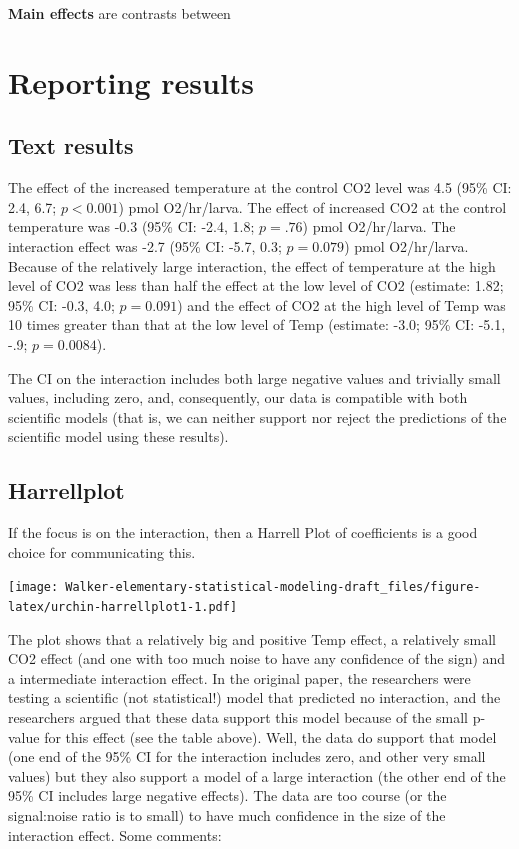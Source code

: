 \documentclass[]{book}
\theoremstyle{definition}
\theoremstyle{definition}
\theoremstyle{definition}
\theoremstyle{remark}
\begin{document}
\textbf{Main effects} are contrasts between

\section{Reporting results}\label{reporting-results-2}

\subsection{Text results}\label{text-results}

The effect of the increased temperature at the control CO2 level was 4.5
(95\% CI: 2.4, 6.7; \(p < 0.001\)) pmol O2/hr/larva. The effect of
increased CO2 at the control temperature was -0.3 (95\% CI: -2.4, 1.8;
\(p=.76\)) pmol O2/hr/larva. The interaction effect was -2.7 (95\% CI:
-5.7, 0.3; \(p = 0.079\)) pmol O2/hr/larva. Because of the relatively
large interaction, the effect of temperature at the high level of CO2
was less than half the effect at the low level of CO2 (estimate: 1.82;
95\% CI: -0.3, 4.0; \(p = 0.091\)) and the effect of CO2 at the high
level of Temp was 10 times greater than that at the low level of Temp
(estimate: -3.0; 95\% CI: -5.1, -.9; \(p = 0.0084\)).

The CI on the interaction includes both large negative values and
trivially small values, including zero, and, consequently, our data is
compatible with both scientific models (that is, we can neither support
nor reject the predictions of the scientific model using these results).

\subsection{Harrellplot}\label{harrellplot}

If the focus is on the interaction, then a Harrell Plot of coefficients
is a good choice for communicating this.

\texttt{[image: Walker-elementary-statistical-modeling-draft\_files/figure-latex/urchin-harrellplot1-1.pdf]}

The plot shows that a relatively big and positive Temp effect, a
relatively small CO2 effect (and one with too much noise to have any
confidence of the sign) and a intermediate interaction effect. In the
original paper, the researchers were testing a scientific (not
statistical!) model that predicted no interaction, and the researchers
argued that these data support this model because of the small p-value
for this effect (see the table above). Well, the data do support that
model (one end of the 95\% CI for the interaction includes zero, and
other very small values) but they also support a model of a large
interaction (the other end of the 95\% CI includes large negative
effects). The data are too course (or the signal:noise ratio is to
small) to have much confidence in the size of the interaction effect.
Some comments:
\end{document}
